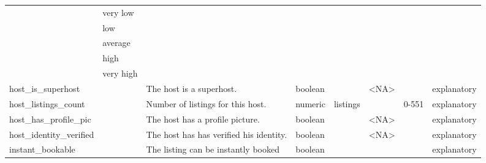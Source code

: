 \begin{center}
\begin{xltabular}{\textwidth}{llXlllll}
                            & very low                       &                                   &             &                &                             &                     &  \\
                            & low                         &                                   &             &                &                             &                     &  \\
                            & average                     &                                   &             &                &                             &                     &  \\
                            & high                        &                                   &             &                &                             &                     &  \\
                            & very high                   &                                   &             &                &                             &                     &  \\
host\_is\_superhost         &                             & The host is a superhost. & boolean &                & \textless{}NA\textgreater{} &                     & explanatory \\
host\_listings\_count        &                             & Number of listings for this host. & numeric     & listings       &                             &                     0-551   & explanatory \\
host\_has\_profile\_pic     &                             & The host has a profile picture. & boolean     &                & \textless{}NA\textgreater{} &                     & explanatory \\
host\_identity\_verified    &                             & The host has has verified his identity. & boolean     &                & \textless{}NA\textgreater{} &                     & explanatory \\
instant\_bookable           &                             & The listing can be instantly booked & boolean     &                &                             &                     & explanatory \\


\end{xltabular}
\end{center}

